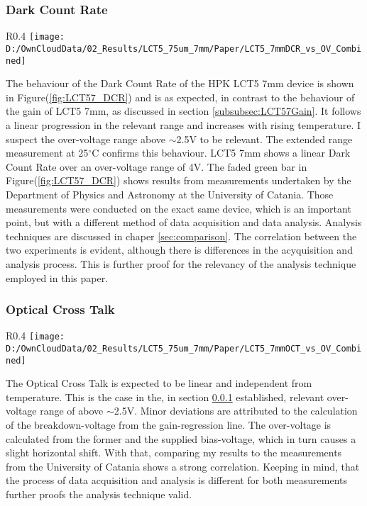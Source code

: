\documentclass[12pt,article,type=msc,colorback,accentcolor=tud9c]{tudthesis}
\begin{document}
\subsubsection{Dark Count Rate}
\label{subsubsec:LCT57DCR}
\begin{wrapfigure}{R}{0.4\textwidth}
\centering
\texttt{[image: D:/OwnCloudData/02\_Results/LCT5\_75um\_7mm/Paper/LCT5\_7mmDCR\_vs\_OV\_Combined]}
\caption{\label{fig:LCT57_DCR}Dark Count Rate of the HPK LCT5 7mm pixel}
\end{wrapfigure}
The behaviour of the Dark Count Rate of the HPK LCT5 7mm device is shown in Figure(\ref{fig:LCT57_DCR}) and is as expected, in contrast to the behaviour of the gain of LCT5 7mm, as discussed in section {\ref{subsubsec:LCT57Gain}}. It follows a linear progression in the relevant range and increases with rising temperature. I suspect the over-voltage range above $\sim$2.5V to be relevant. The extended range measurement at 25$^\circ$C confirms this behaviour. LCT5 7mm shows a linear Dark Count Rate over an over-voltage range of 4V. The faded green bar in Figure(\ref{fig:LCT57_DCR}) shows results from measurements undertaken by the Department of Physics and Astronomy at the University of Catania. Those measurements were conducted on the exact same device, which is an important point, but with a different method of data acquisition and data analysis. Analysis techniques are discussed in chaper {\ref{sec:comparison}}. The correlation between the two experiments is evident, although there is differences in the acyquisition and analysis process. This is further proof for the relevancy of the analysis technique employed in this paper. 


\subsubsection{Optical Cross Talk}
\begin{wrapfigure}{R}{0.4\textwidth}
\centering
\texttt{[image: D:/OwnCloudData/02\_Results/LCT5\_75um\_7mm/Paper/LCT5\_7mmOCT\_vs\_OV\_Combined]}
\caption{\label{fig:LCT57_OCT}Dark Count Rate of the HPK LCT5 7mm pixel}
\end{wrapfigure}

The Optical Cross Talk is expected to be linear and independent from temperature. This is the case in the, in section {\ref{subsubsec:LCT57DCR}} established, relevant over-voltage range of above $\sim$2.5V. Minor deviations are attributed to the calculation of the breakdown-voltage from the gain-regression line. The over-voltage is calculated from the former and the supplied bias-voltage, which in turn causes a slight horizontal shift. With that, comparing my results to the measurements from the University of Catania shows a strong correlation. Keeping in mind, that the process of data acquisition and analysis is different for both measurements further proofs the analysis technique valid. 
\end{document}
